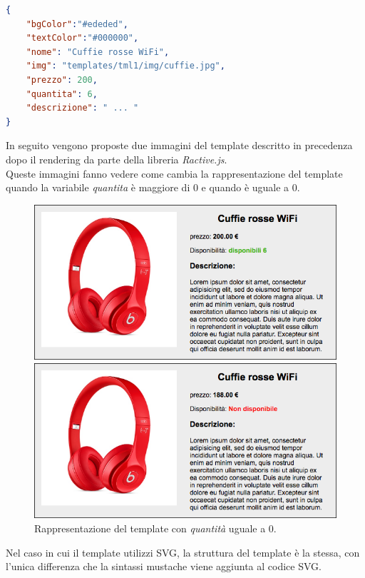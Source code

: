 \begin{lstlisting}[language=JSON, caption=Rappresentazione dell'oggetto JSON.]
{
	"bgColor":"#ededed",
	"textColor":"#000000",
	"nome": "Cuffie rosse WiFi",
	"img": "templates/tml1/img/cuffie.jpg",
	"prezzo": 200,
	"quantita": 6,
	"descrizione": " ... "
}
\end{lstlisting}

\newpage

In seguito vengono proposte due immagini del template descritto in precedenza dopo il rendering da parte della libreria \textit{Ractive.js}.\\
Queste immagini fanno vedere come cambia la rappresentazione del template quando la variabile \textit{quantita} è maggiore di 0 e quando è uguale a 0.
\begin{figure}[htp]
	\centering
	\includegraphics[scale=0.4]{../immagini/screenshot_tml1_1}
	\caption{Rappresentazione del template con \textit{quantità} maggiore di 0.}
	\includegraphics[scale=0.4]{../immagini/screenshot_tml1_2}
	\caption{Rappresentazione del template con \textit{quantità} uguale a 0.}
\end{figure}

Nel caso in cui il template utilizzi SVG, la struttura del template è la stessa, con l'unica differenza che la sintassi mustache viene aggiunta al codice SVG.

